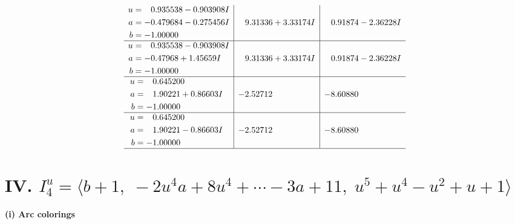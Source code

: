 \documentclass[1p]{elsarticle_modified}
\theoremstyle{definition}
\begin{document}
$$\begin{array}{c|c|c}
\begin{aligned}
u &= \phantom{-}0.935538 - 0.903908 I \\
a &= -0.479684 - 0.275456 I \\
b &= -1.00000\phantom{ +0.000000I}\end{aligned}
 & \phantom{-}9.31336 + 3.33174 I & \phantom{-}0.91874 - 2.36228 I \\ \hline\begin{aligned}
u &= \phantom{-}0.935538 - 0.903908 I \\
a &= -0.47968 + 1.45659 I \\
b &= -1.00000\phantom{ +0.000000I}\end{aligned}
 & \phantom{-}9.31336 + 3.33174 I & \phantom{-}0.91874 - 2.36228 I \\ \hline\begin{aligned}
u &= \phantom{-}0.645200\phantom{ +0.000000I} \\
a &= \phantom{-}1.90221 + 0.86603 I \\
b &= -1.00000\phantom{ +0.000000I}\end{aligned}
 & -2.52712\phantom{ +0.000000I} & -8.60880\phantom{ +0.000000I} \\ \hline\begin{aligned}
u &= \phantom{-}0.645200\phantom{ +0.000000I} \\
a &= \phantom{-}1.90221 - 0.86603 I \\
b &= -1.00000\phantom{ +0.000000I}\end{aligned}
 & -2.52712\phantom{ +0.000000I} & -8.60880\phantom{ +0.000000I}\\
 \hline 
 \end{array}$$\newpage\newpage\renewcommand{\arraystretch}{1}
\centering \section*{IV. $I^u_{4}= \langle b+1,\;-2 u^4 a+8 u^4+\cdots-3 a+11,\;u^5+u^4- u^2+u+1 \rangle$}
\flushleft \textbf{(i) Arc colorings}\\
\end{document}

